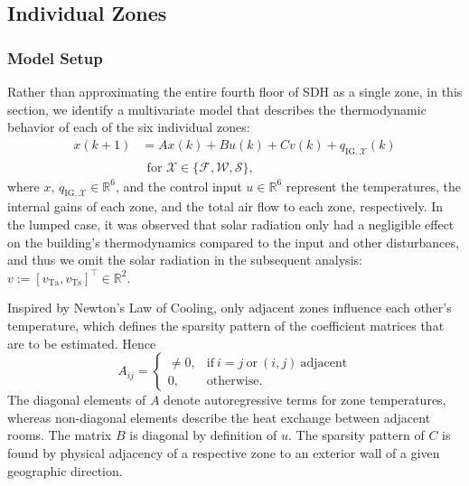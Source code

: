 \subsection{Individual Zones}\label{sec:Indiv_Zones}
\subsubsection{Model Setup}
Rather than approximating the entire fourth floor of SDH as a single zone, in this section, we identify a multivariate model that describes the thermodynamic behavior of each of the six individual zones:
\begin{equation}
\begin{aligned}\label{eq:temp_propagation_indiv}
x(k+1) &= A x(k) + B u(k) + C v(k) + q_{\text{IG},\mathcal{X}}(k) \\
& ~~ \text{for } \mathcal{X} \in \lbrace \mathcal{F}, \mathcal{W}, \mathcal{S} \rbrace,
\end{aligned}
\end{equation}
where $x$, $q_{\text{IG},\mathcal{X}} \in \mathbb{R}^6$, and the control input $u \in \mathbb{R}^6$ represent the temperatures, the internal gains of each zone, and the total air flow to each zone, respectively. In the lumped case, it was observed that solar radiation only had a negligible effect on the building's thermodynamics compared to the input and other disturbances, and thus we omit the solar radiation in the subsequent analysis: $v := \left[ v_\text{Ta}, v_\text{Ts} \right]^\top \in \mathbb{R}^2$.

Inspired by Newton's Law of Cooling, only adjacent zones influence each other's temperature, which defines the sparsity pattern of the coefficient matrices that are to be estimated. Hence 
\begin{equation}
A_{ij} = \begin{cases}
      \neq 0, & \text{if}\ i=j~\text{or}~(i,j)~ \text{adjacent}  \\
      0, & \text{otherwise.}
    \end{cases}
\end{equation}
The diagonal elements of $A$ denote autoregressive terms for zone temperatures, whereas non-diagonal elements describe the heat exchange between adjacent rooms. The matrix $B$ is diagonal by definition of $u$. The sparsity pattern of $C$ is found by physical adjacency of a respective zone to an exterior wall of a given geographic direction.

